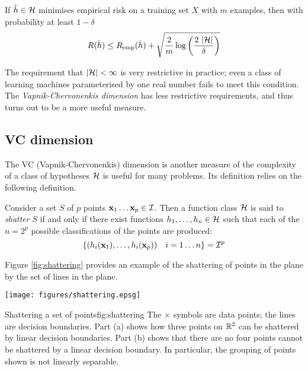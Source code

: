 \begin{theorem}
If $\hat{h} \in \mathcal{H}$ minimises empirical risk on a training set $X$
with $m$ examples, then with probability at least $1 - \delta$
%
\begin{equation}
R(\hat{h}) \leq R_{\mathrm{emp}}(\hat{h}) + \sqrt{\frac{2}{m}
\log \left( \frac{2\  |\mathcal{H}|}{\delta} \right)}
\end{equation}
\end{theorem}

The requirement that $|\mathcal{H}| < \infty$ is very restrictive in
practice; even a class of learning machines parameterised by one real
number fails to meet this condition.  The \emph{Vapnik-Chervonenkis
dimension} has less restrictive requirements, and thus turns out to be
a more useful measure.


\subsection{VC dimension}
\label{acr:vcdim}
\label{sec:vcdim}

The VC (Vapnik-Chervonenkis) dimension is another measure of the complexity
of a class of hypotheses $\mathcal{H}$ is useful for many problems.  Its
definition relies on the following definition.

\begin{definition}[Shattering]
Consider a set $S$ of $p$ points $\mathbf{x}_1 \ldots \mathbf{x}_p \in \mathcal{I}$.  Then a
function class $\mathcal{H}$ is said to \emph{shatter} $S$ if and only if
there exist functions $h_1, \ldots, h_n \in \mathcal{H}$ such that each of
the $n = 2^p$ possible classifications of the points are produced:
%
\begin{equation}
\left\{ (h_i(\mathbf{x}_1), \ldots, h_i(\mathbf{x}_p)) \quad i=1 \ldots n \right\}
= \mathcal{I}^p
\end{equation}
%
\end{definition}

Figure \ref{fig:shattering} provides an example of the shattering of
points in the plane by the set of lines in the plane.

\begin{linefigure}
\begin{center}
\texttt{[image: figures/shattering.epsg]}
\end{center}
\label{fig:shattering}
\begin{capt}{Shattering a set of points}{fig:shattering}
The $\times$ symbols are data points; the lines are decision boundaries.
Part (a) shows how three points on $\mathbb{R}^2$ can be shattered by linear
decision boundaries.  Part (b) shows that there are no four points
cannot be shattered by a linear decision boundary.  In particular, the
grouping of points shown is not linearly separable.
\end{capt}
\end{linefigure}

